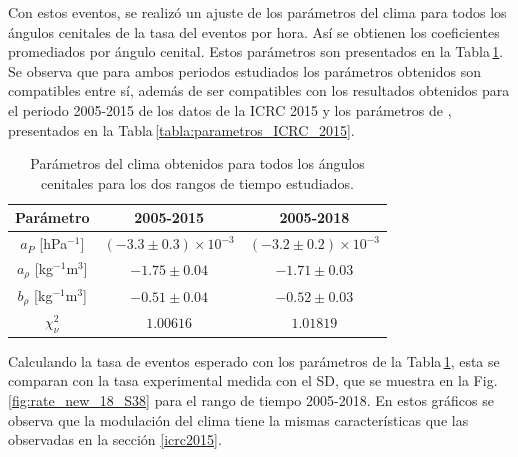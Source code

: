         Con estos eventos, se realizó un  ajuste de los parámetros del clima para todos los ángulos cenitales de la tasa del eventos por hora. Así se obtienen los coeficientes promediados por ángulo cenital. Estos parámetros son presentados en la Tabla\,\ref{tabla:parametros_ICRC_2019_S38}. Se observa que para ambos periodos estudiados los parámetros obtenidos son compatibles entre sí, además de ser compatibles con los resultados obtenidos para el periodo 2005-2015 de los datos de la ICRC 2015 y los parámetros de \cite{aab2017impact}, presentados en la Tabla\,\ref{tabla:parametros_ICRC_2015}.

        \begin{table}[H]
            \centering
            \begin{tabular}{|c|c|c|}
            \hline
            {Parámetro}                 & {2005-2015}    		        & {2005-2018}    \\ \hline
            $a_P$ [hPa$^{-1}$]          & $ (-3.3\pm 0.3)\times 10^{-3}$& $(-3.2\pm 0.2)\times 10^{-3}$  \\ \hline
            $a_\rho$ [kg$^{-1}$m$^3$]   & $ -1.75\pm 0.04$            	& $ -1.71\pm 0.03$       \\ \hline
            $b_\rho$ [kg$^{-1}$m$^3$]   & $ -0.51\pm 0.04$             	& $ -0.52\pm 0.03$       \\ \hline
            $\chi^2_\nu$                & $1.00616$                     & $1.01819$              \\   \hline
            \end{tabular} 
            \caption{Parámetros del clima obtenidos para todos los ángulos cenitales para los dos rangos de tiempo estudiados.} \label{tabla:parametros_ICRC_2019_S38}
        \end{table}
        
        Calculando la tasa de eventos esperado con los parámetros de la Tabla\,\ref{tabla:parametros_ICRC_2019_S38}, esta se comparan con la tasa experimental medida con el SD, que se muestra en la Fig. \ref{fig:rate_new_18_S38} para el rango de tiempo 2005-2018. En estos gráficos se observa que la modulación del clima tiene la mismas características que las observadas en la sección \ref{icrc2015}.

